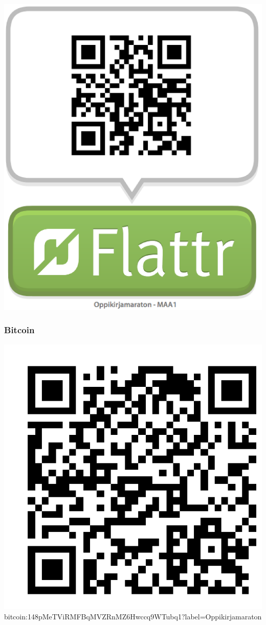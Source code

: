 \includegraphics[scale=0.2]{MAA1-Flattr.png}


\subsubsection*{Bitcoin}

\includegraphics[scale=0.2]{Oppikirjamaraton-Bitcoin.png}
bitcoin:148pMeTViRMFBqMVZRnMZ6Hwccq9WTubq1?label=Oppikirjamaraton

